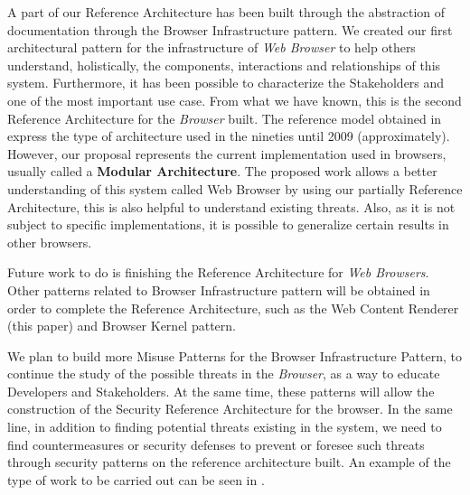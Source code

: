 \documentclass{sig-alternate-05-2015}
\begin{document}
A part of our Reference Architecture has been built through the abstraction of documentation through the Browser Infrastructure pattern. We created our first architectural pattern for the infrastructure of \textit{Web Browser} to help others understand, holistically, the components, interactions and relationships of this system. Furthermore, it has been possible to characterize the Stakeholders and one of the most important use case. From what we have known, this is the second Reference Architecture for the \textit{Browser} built. The reference model obtained in \cite{2005-grosskurth-browser-refarch} express the type of architecture used in the nineties until 2009 (approximately). However, our proposal represents the current implementation used in browsers, usually called a \textbf{Modular Architecture}. The proposed work allows a better understanding of this system called Web Browser by using our partially Reference Architecture, this is also helpful to understand existing threats. Also, as it is not subject to specific implementations, it is possible to generalize certain results in other browsers. 

Future work to do is finishing the Reference Architecture for \textit{Web Browsers}. Other patterns related to Browser Infrastructure pattern will be obtained in order to complete the Reference Architecture, such as the Web Content Renderer (this paper) and Browser Kernel pattern. 

We plan to build more Misuse Patterns for the Browser Infrastructure Pattern, to continue the study of the possible threats in the \textit{Browser}, as a way to educate Developers and Stakeholders. At the same time, these patterns will allow the construction of the Security Reference Architecture for the browser. In the same line, in addition to finding potential threats existing in the system, we need to find countermeasures or security defenses to prevent or foresee such threats through security patterns on the reference architecture built. An example of the type of work to be carried out can be seen in \cite{Fernandez2015}.


  

\end{document}
